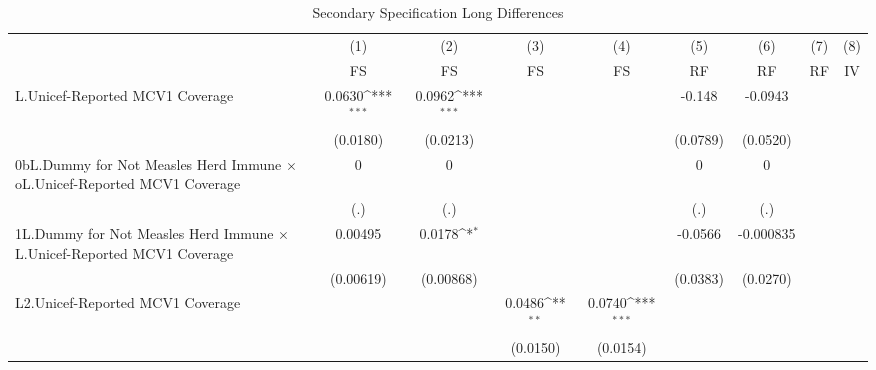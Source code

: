 \begin{table}[htbp]\centering
\def\sym#1{\ifmmode^{#1}\else\(^{#1}\)\fi}
\caption{Secondary Specification Long Differences}
\begin{tabular}{l*{8}{c}}
\toprule
                &\multicolumn{1}{c}{(1)}&\multicolumn{1}{c}{(2)}&\multicolumn{1}{c}{(3)}&\multicolumn{1}{c}{(4)}&\multicolumn{1}{c}{(5)}&\multicolumn{1}{c}{(6)}&\multicolumn{1}{c}{(7)}&\multicolumn{1}{c}{(8)}\\
                &\multicolumn{1}{c}{FS}&\multicolumn{1}{c}{FS}&\multicolumn{1}{c}{FS}&\multicolumn{1}{c}{FS}&\multicolumn{1}{c}{RF}&\multicolumn{1}{c}{RF}&\multicolumn{1}{c}{RF}&\multicolumn{1}{c}{IV}\\
\midrule
L.Unicef-Reported MCV1 Coverage&   0.0630\sym{***}&   0.0962\sym{***}&                  &                  &   -0.148         &  -0.0943         &                  &                  \\
                & (0.0180)         & (0.0213)         &                  &                  & (0.0789)         & (0.0520)         &                  &                  \\
\addlinespace
0bL.Dummy for Not Measles Herd Immune $\times$ oL.Unicef-Reported MCV1 Coverage&        0         &        0         &                  &                  &        0         &        0         &                  &                  \\
                &      (.)         &      (.)         &                  &                  &      (.)         &      (.)         &                  &                  \\
\addlinespace
1L.Dummy for Not Measles Herd Immune $\times$ L.Unicef-Reported MCV1 Coverage&  0.00495         &   0.0178\sym{*}  &                  &                  &  -0.0566         &-0.000835         &                  &                  \\
                &(0.00619)         &(0.00868)         &                  &                  & (0.0383)         & (0.0270)         &                  &                  \\
\addlinespace
L2.Unicef-Reported MCV1 Coverage&                  &                  &   0.0486\sym{**} &   0.0740\sym{***}&                  &                  &                  &                  \\
                &                  &                  & (0.0150)         & (0.0154)         &                  &                  &                  &                  \\

\end{tabular}
\end{table}

